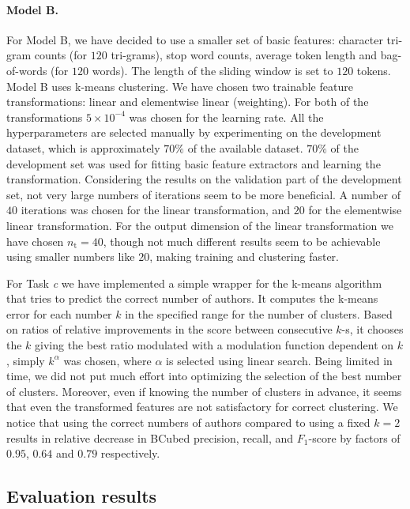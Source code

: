 \documentclass[10pt, a4paper]{article}
\begin{document}
\paragraph{Model B.} 
For Model B, we have decided to use a smaller set of basic features: character tri-gram counts (for $120$ tri-grams), stop word counts, average token length and bag-of-words (for $120$ words). The length of the sliding window is set to $120$ tokens. Model B uses k-means clustering. We have chosen two trainable feature transformations: linear and elementwise linear (weighting). For both of the transformations $5\times 10^{-4}$ was chosen for the learning rate. All the hyperparameters are selected manually by experimenting on the development dataset, which is approximately $70\%$ of the available dataset. $70\%$ of the development set was used for fitting basic feature extractors and learning the transformation. Considering the results on the validation part of the development set, not very large numbers of iterations seem to be more beneficial. A number of $40$ iterations was chosen for the linear transformation, and $20$ for the elementwise linear transformation. For the output dimension of the linear transformation we have chosen $n_\mathrm{t}=40$, though not much different results seem to be achievable using smaller numbers like $20$, making training and clustering faster. 

For Task \emph{c} we have implemented a simple wrapper for the k-means algorithm that tries to predict the correct number of authors. It computes the k-means error for each number $k$ in the specified range for the number of clusters. Based on ratios of relative improvements in the score between consecutive $k$-s, it chooses the $k$ giving the best ratio modulated with a modulation function dependent on $k$, simply $k^\alpha$ was chosen, where $\alpha$ is selected using linear search. Being limited in time, we did not put much effort into optimizing the selection of the best number of clusters. Moreover, even if knowing the number of clusters in advance, it seems that even the transformed features are not satisfactory for correct clustering. We notice that using the correct numbers of authors compared to using a fixed $k=2$ results in relative decrease in BCubed precision, recall, and $F_1$-score by factors of $0.95$, $0.64$ and $0.79$ respectively.

\subsection{Evaluation results}
\end{document}
